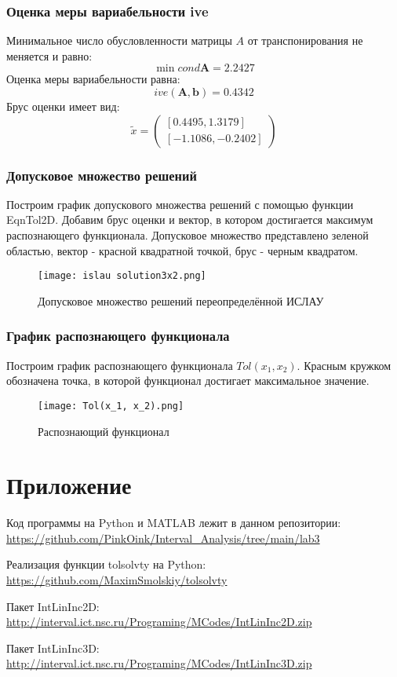 \subsubsection{Оценка меры вариабельности ive}
Минимальное число обусловленности матрицы $A$ от транспонирования не меняется и равно:
\begin{equation}
	\min cond \textbf{A} = 2.2427
\end{equation}
Оценка меры вариабельности равна:
\begin{equation}
	ive(\textbf{A}, \textbf{b}) = 0.4342
\end{equation}
Брус оценки имеет вид:
\begin{equation}
	\tilde{x} =
	\begin{pmatrix}
		[0.4495, 1.3179] \\
		[-1.1086, -0.2402]
	\end{pmatrix}
\end{equation}

\subsubsection{Допусковое множество решений}
Построим график допускового множества решений с помощью функции EqnTol2D. Добавим брус оценки и вектор, в котором достигается максимум распознающего функционала. Допусковое множество представлено зеленой областью, вектор - красной квадратной точкой, брус - черным квадратом. \\
\begin{figure}[h]
	\centering
	\texttt{[image: islau solution3x2.png]}
	\caption{Допусковое множество решений переопределённой ИСЛАУ}
\end{figure}

\subsubsection{График распознающего функционала}
Построим график распознающего функционала $Tol(x_1, x_2)$. Красным кружком обозначена точка, в которой функционал достигает максимальное значение. \\
\newpage
\begin{figure}[h]
	\centering
	\texttt{[image: Tol(x\_1, x\_2).png]}
	\caption{Распознающий функционал}
\end{figure}



\section{Приложение}
Код программы на Python и MATLAB лежит в данном репозитории: \\
\url{https://github.com/PinkOink/Interval_Analysis/tree/main/lab3}{}

Реализация функции tolsolvty на Python: \\
\url{https://github.com/MaximSmolskiy/tolsolvty}{}

Пакет IntLinInc2D: \\
\url{http://interval.ict.nsc.ru/Programing/MCodes/IntLinInc2D.zip}{}

Пакет IntLinInc3D: \\
\url{http://interval.ict.nsc.ru/Programing/MCodes/IntLinInc3D.zip}{}


